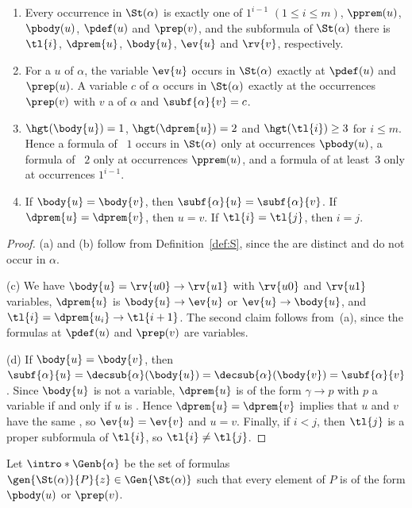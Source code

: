 \begin{lemma}\label{lem:shape}
\leavevmode
\begin{enumerate}
\item[(a)] Every occurrence in $\St(\alpha)$ is exactly one of $1^{i-1}$
  $(1\le i\le m)$, $\pprem(u)$, $\pbody(u)$, $\pdef(u)$ and $\prep(v)$,
  and the subformula of $\St(\alpha)$ there is $\tl{i}$, $\dprem{u}$,
  $\body{u}$, $\ev{u}$ and $\rv{v}$, respectively.
\item[(b)] For a  $u$ of $\alpha$, the variable
  $\ev{u}$ occurs in $\St(\alpha)$ exactly at $\pdef(u)$ and $\prep(u)$. A
  variable $c$ of $\alpha$ occurs in $\St(\alpha)$ exactly at the
  occurrences $\prep(v)$ with $v$ a  of $\alpha$ and
  $\subf{\alpha}{v}=c$.
\item[(c)] $\hgt(\body{u})=1$, $\hgt(\dprem{u})=2$ and $\hgt(\tl{i})\ge3$
  for $i\le m$. Hence a formula of ~$1$ occurs in $\St(\alpha)$
  only at occurrences $\pbody(u)$, a formula of ~$2$ only at
  occurrences $\pprem(u)$, and a formula of  at least~$3$ only
  at occurrences $1^{i-1}$.
\item[(d)] If $\body{u}=\body{v}$, then $\subf{\alpha}{u}=\subf{\alpha}{v}$.
  If $\dprem{u}=\dprem{v}$, then $u=v$. If $\tl{i}=\tl{j}$, then $i=j$.
\end{enumerate}
\end{lemma}
\begin{proof}
(a) and (b) follow from Definition~\ref{def:S}, since the
 are distinct and do not occur in $\alpha$.

(c) We have $\body{u}=\rv{u0}\to\rv{u1}$ with $\rv{u0}$ and $\rv{u1}$
variables, $\dprem{u}$ is $\body{u}\to\ev{u}$ or $\ev{u}\to\body{u}$, and
$\tl{i}=\dprem{u_i}\to\tl{i+1}$. The second claim follows from~(a), since
the formulas at $\pdef(u)$ and $\prep(v)$ are variables.

(d) If $\body{u}=\body{v}$, then
$\subf{\alpha}{u}=\decsub{\alpha}(\body{u})=\decsub{\alpha}(\body{v})=\subf{\alpha}{v}$.
Since $\body{u}$ is not a variable, $\dprem{u}$ is of the form
$\gamma\to p$ with $p$ a variable if and only if $u$ is .
Hence $\dprem{u}=\dprem{v}$ implies that $u$ and $v$ have the same
, so $\ev{u}=\ev{v}$ and $u=v$. Finally, if $i<j$, then
$\tl{j}$ is a proper subformula of $\tl{i}$, so $\tl{i}\ne\tl{j}$.
\end{proof}

\AP Let $\intro*\Genb{\alpha}$ be the set of formulas
$\gen{\St(\alpha)}{P}{z}\in\Gen{\St(\alpha)}$ such that every element of $P$
is of the form $\pbody(u)$ or $\prep(v)$.

